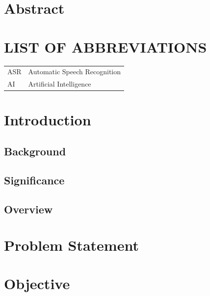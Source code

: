 \documentclass[a4paper,12pt,onepage]{article}
\begin{document}
\cleardoublepage
\section*{Abstract}

\cleardoublepage

{
  \setlength{\parskip}{0em}
  \renewcommand\contentsname{Table of Contents} %
  \tableofcontents {}
}

\cleardoublepage
\setlength{\parskip}{0em}
\listoffigures

\newpage

\section*{LIST OF ABBREVIATIONS}

\begin{tabular}{l l}
  ASR & Automatic Speech Recognition \\
  AI & Artificial Intelligence \\
\end{tabular}

\cleardoublepage
{}
\section{Introduction}

\subsection{Background}

\newpage
\subsection{Significance}

\subsection{Overview}

\newpage
\section{Problem Statement}

\newpage
\section{Objective}
\end{document}
